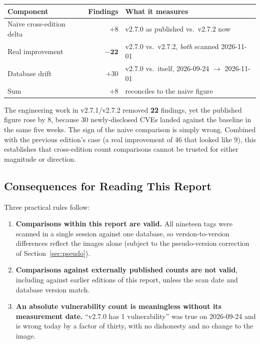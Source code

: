 \documentclass{article}
\begin{document}
\begin{center}
\begin{tabular}{l r l}
\toprule
\textbf{Component} & \textbf{Findings} & \textbf{What it measures} \\
\midrule
Naive cross-edition delta   & $+8$  & v2.7.0 as published vs.\ v2.7.2 now \\
\midrule
Real improvement            & $\mathbf{-22}$ & v2.7.0 vs.\ v2.7.2, \emph{both} scanned 2026-11-01 \\
Database drift              & $+30$ & v2.7.0 vs.\ itself, 2026-09-24 $\rightarrow$ 2026-11-01 \\
\midrule
Sum                         & $+8$  & reconciles to the naive figure \\
\bottomrule
\end{tabular}
\end{center}

\noindent The engineering work in v2.7.1/v2.7.2 removed \textbf{22} findings, yet the published figure rose by 8, because 30 newly-disclosed CVEs landed against the baseline in the same five weeks. The sign of the naive comparison is simply wrong. Combined with the previous edition's case (a real improvement of 46 that looked like 9), this establishes that cross-edition count comparisons cannot be trusted for either magnitude or direction.

\subsection{Consequences for Reading This Report}

Three practical rules follow:

\begin{enumerate}
    \item \textbf{Comparisons within this report are valid.} All nineteen tags were scanned in a single session against one database, so version-to-version differences reflect the images alone (subject to the pseudo-version correction of Section~\ref{sec:pseudo}).
    \item \textbf{Comparisons against externally published counts are not valid}, including against earlier editions of this report, unless the scan date and database version match.
    \item \textbf{An absolute vulnerability count is meaningless without its measurement date.} ``v2.7.0 has 1 vulnerability'' was true on 2026-09-24 and is wrong today by a factor of thirty, with no dishonesty and no change to the image.
\end{enumerate}
\end{document}
